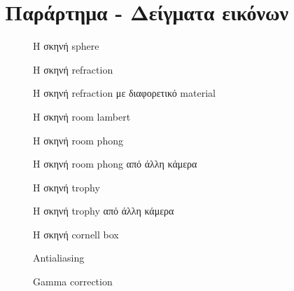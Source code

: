 \chapter{Παράρτημα - Δείγματα εικόνων}

\graphicspath{{appendix1/fig/}}

\begin{figure} 
\centering 
\caption{H σκηνή sphere}
\end{figure}

\begin{figure} 
\centering 
\caption{H σκηνή refraction}
\end{figure}

\begin{figure} 
\centering 
\caption{H σκηνή refraction με διαφορετικό material}
\end{figure}

\begin{figure} 
\centering 
\caption{H σκηνή room lambert}
\end{figure}

\begin{figure} 
\centering 
\caption{H σκηνή room phong}
\end{figure}

\begin{figure} 
\centering 
\caption{H σκηνή room phong από άλλη κάμερα}
\end{figure}

\begin{figure} 
\centering 
\caption{H σκηνή trophy}
\end{figure}

\begin{figure} 
\centering 
\caption{H σκηνή trophy από άλλη κάμερα}
\end{figure}

\begin{figure} 
\centering 
\caption{H σκηνή cornell box}
\end{figure}

\begin{figure} 
\centering 
\caption{Antialiasing}
\end{figure}

\begin{figure} 
\centering 
\caption{Gamma correction}
\end{figure}
